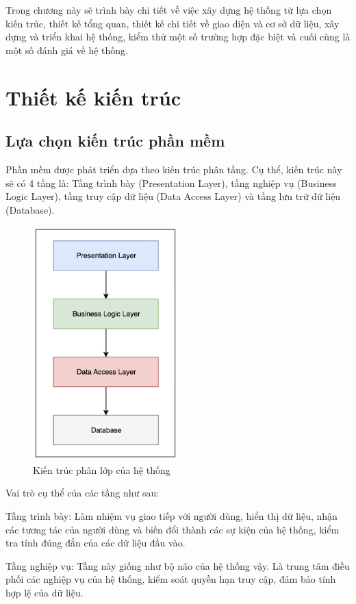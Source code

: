 \documentclass[../DoAn.tex]{subfiles}
\begin{document}
\raggedbottom
Trong chương này sẽ trình bày chi tiết về việc xây dựng hệ thống từ lựa chọn kiến trúc, thiết kế tổng quan, thiết kế chi tiết về giao diện và cơ sở dữ liệu, xây dựng và triển khai hệ thống, kiểm thử một số trường hợp đặc biệt và cuối cùng là một số đánh giá về hệ thống.

\section{Thiết kế kiến trúc}
\subsection{Lựa chọn kiến trúc phần mềm}
Phần mềm được phát triển dựa theo kiến trúc phân tầng. Cụ thể, kiến trúc này sẽ có 4 tầng là: Tầng trình bày (Presentation Layer), tầng nghiệp vụ (Business Logic Layer), tầng truy cập dữ liệu (Data Access Layer) và tầng lưu trữ dữ liệu (Database).
\begin{figure}[H]
    \centering
    \includegraphics[width=0.5\textwidth]{Hinhve/KienTrucHeThong.png}
    \caption{Kiến trúc phân lớp của hệ thống}
\end{figure}
Vai trò cụ thể của các tầng như sau:

Tầng trình bày: Làm nhiệm vụ giao tiếp với người dùng, hiển thị dữ liệu, nhận các tương tác của người dùng và biến đổi thành các sự kiện của hệ thống, kiểm tra tính đúng đắn của các dữ liệu đầu vào.

Tầng nghiệp vụ: Tầng này giống như bộ não của hệ thống vậy. Là trung tâm điều phối các nghiệp vụ của hệ thống, kiểm soát quyền hạn truy cập, đảm bảo tính hợp lệ của dữ liệu.
\end{document}
